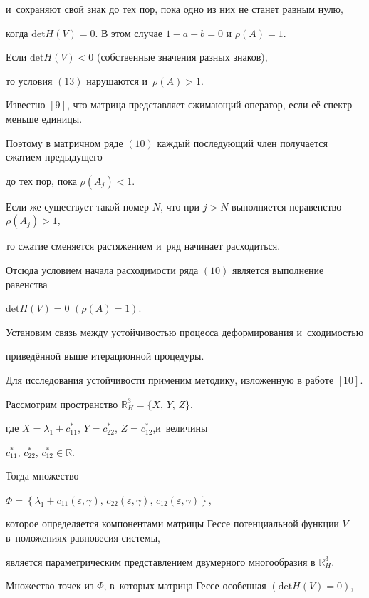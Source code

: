 и~сохраняют свой знак до тех пор, пока одно из них не станет равным нулю,

когда $\text{det}H(V)=0$.  В этом случае $1-a+b=0$ и $\rho(A)=1$.

Если $\text{det}H(V)<0$  (собственные значения разных знаков),

то условия $(13)$ нарушаются и~$\rho(A)>1$.



Известно $[9]$, что матрица представляет сжимающий оператор, если её спектр меньше единицы.

Поэтому в матричном ряде $(10)$ каждый последующий член получается сжатием предыдущего

до тех пор, пока $\rho(A_j)<1$.

Если же существует такой номер $N$,  что при $j>N$  выполняется неравенство $\rho(A_j)>1$,

то сжатие сменяется растяжением и~ряд начинает расходиться.

Отсюда условием начала расходимости ряда $(10)$ является выполнение равенства

$\text{det} H(V)=0$ $\left(\rho(A)=1\right)$.




Установим связь между устойчивостью процесса деформирования и~сходимостью

приведённой выше итерационной процедуры.

Для исследования устойчивости применим методику, изложенную в работе $[10]$.

Рассмотрим пространство $\mathbb{R}^3_{H}=\{X,\, Y,\, Z\}$,

где $X=\lambda_1+c^*_{11}$, $Y=c^*_{22}$, $Z=c^*_{12}$,и~величины

 $c^*_{11}$, $c^*_{22}$, $c^*_{12}\in \mathbb R$.

Тогда множество

$\Phi=\left\{\lambda_1+c_{11}(\varepsilon, \gamma), \, c_{22}(\varepsilon, \gamma),\,  c_{12}(\varepsilon, \gamma)\right\}$,

которое определяется компонентами матрицы Гессе потенциальной функции $V$ в~положениях равновесия системы,

является параметрическим представлением двумерного многообразия в $\mathbb{R}^3_{H}$.

Множество точек из $\Phi$, в~которых матрица Гессе особенная $(\text{det} H(V)=0)$,


